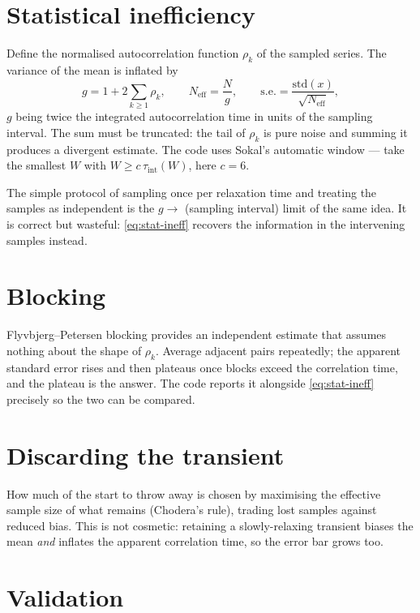 \documentclass[11pt,a4paper]{report}
\begin{document}
\section{Statistical inefficiency}

Define the normalised autocorrelation function $\rho_k$ of the sampled series. The
variance of the mean is inflated by
\begin{equation}
  g = 1 + 2\sum_{k\ge1}\rho_k,
  \qquad
  N_{\mathrm{eff}} = \frac{N}{g},
  \qquad
  \mathrm{s.e.} = \frac{\mathrm{std}(x)}{\sqrt{N_{\mathrm{eff}}}} ,
  \label{eq:stat-ineff}
\end{equation}
$g$ being twice the integrated autocorrelation time in units of the sampling
interval. The sum must be truncated: the tail of $\rho_k$ is pure noise and
summing it produces a divergent estimate. The code uses Sokal's automatic window
--- take the smallest $W$ with $W \ge c\,\tau_{\mathrm{int}}(W)$, here $c = 6$.

The simple protocol of sampling once per relaxation time and treating the samples
as independent is the $g \to$ (sampling interval) limit of the same idea. It is
correct but wasteful: \eqref{eq:stat-ineff} recovers the information in the
intervening samples instead.

\section{Blocking}

Flyvbjerg--Petersen blocking provides an independent estimate that assumes nothing
about the shape of $\rho_k$. Average adjacent pairs repeatedly; the apparent
standard error rises and then plateaus once blocks exceed the correlation time,
and the plateau is the answer. The code reports it alongside
\eqref{eq:stat-ineff} precisely so the two can be compared.

\section{Discarding the transient}

How much of the start to throw away is chosen by maximising the effective sample
size of what remains (Chodera's rule), trading lost samples against reduced bias.
This is not cosmetic: retaining a slowly-relaxing transient biases the mean
\emph{and} inflates the apparent correlation time, so the error bar grows too.

\section{Validation}
\end{document}

